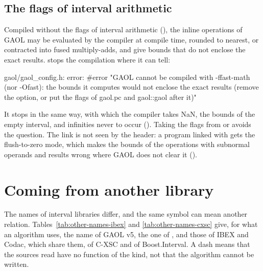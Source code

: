 \subsection{The flags of interval arithmetic}

Compiled without the flags of interval arithmetic (), the
inline operations of GAOL may be evaluated by the compiler at compile time,
rounded to nearest, or contracted into fused multiply-adds, and give bounds
that do not enclose the exact results.  stops the
compilation where it can tell:

\begin{onscreen}
gaol/gaol_config.h: error: #error "GAOL cannot be
compiled with -ffast-math (nor -Ofast): the bounds it
computes would not enclose the exact results (remove
the option, or put the flags of gaol.pc and gaol::gaol
after it)"
\end{onscreen}

\noindent
It stops  in the same way, with which the compiler
takes NaN, the bounds of the empty interval, and infinities never to occur
(). Taking the flags from  or
 avoids the question. The link is not seen by the header: a
program linked with  gets the flush-to-zero mode, which makes
the bounds of the operations with subnormal operands and results wrong where
GAOL does not clear it
().\newinvfive

\section{Coming from another library}\label{sec:other-libraries}
%
%
%
%
%
%

The names of interval libraries differ, and the same symbol can mean another
relation. Tables~\ref{tab:other-names-ibex} and \ref{tab:other-names-cxsc}
give, for what an algorithm uses, the name of GAOL v5, the one of
, and those of IBEX and Codac, which share them, of
C-XSC and of Boost.Interval. A dash means that the sources read have no
function of the kind, not that the algorithm cannot be written.\newinvfive

